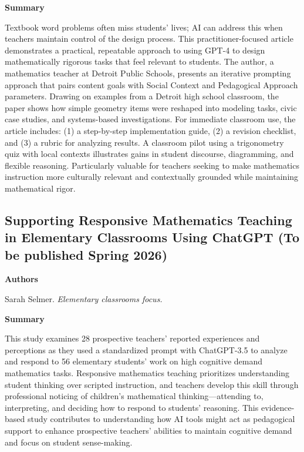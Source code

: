 \documentclass[11pt, a4paper]{article}
\newenvironment{annotation}[1]
{\par\vspace{2pt}\noindent\textbf{#1}\par\vspace{1pt}\noindent\small\ignorespaces}
{\par\vspace{3pt}}
\begin{document}
\begin{annotation}{Summary}
Textbook word problems often miss students' lives; AI can address this when teachers maintain control of the design process. This practitioner-focused article demonstrates a practical, repeatable approach to using GPT-4 to design mathematically rigorous tasks that feel relevant to students. The author, a mathematics teacher at Detroit Public Schools, presents an iterative prompting approach that pairs content goals with Social Context and Pedagogical Approach parameters. Drawing on examples from a Detroit high school classroom, the paper shows how simple geometry items were reshaped into modeling tasks, civic case studies, and systems-based investigations. For immediate classroom use, the article includes: (1) a step-by-step implementation guide, (2) a revision checklist, and (3) a rubric for analyzing results. A classroom pilot using a trigonometry quiz with local contexts illustrates gains in student discourse, diagramming, and flexible reasoning. Particularly valuable for teachers seeking to make mathematics instruction more culturally relevant and contextually grounded while maintaining mathematical rigor.
\end{annotation}


\subsection[\texorpdfstring{Supporting Responsive Mathematics Teaching in Elementary Classrooms Using ChatGPT }{Supporting Responsive Mathematics Teaching in Elementary Classrooms Using ChatGPT }]{Supporting Responsive Mathematics Teaching in Elementary Classrooms Using ChatGPT (To be published Spring 2026)}

\begin{annotation}{Authors}
Sarah Selmer. \textit{Elementary classrooms focus.}
\end{annotation}

\begin{annotation}{Summary}
This study examines 28 prospective teachers' reported experiences and perceptions as they used a standardized prompt with ChatGPT-3.5 to analyze and respond to 56 elementary students' work on high cognitive demand mathematics tasks. Responsive mathematics teaching prioritizes understanding student thinking over scripted instruction, and teachers develop this skill through professional noticing of children's mathematical thinking---attending to, interpreting, and deciding how to respond to students' reasoning. This evidence-based study contributes to understanding how AI tools might act as pedagogical support to enhance prospective teachers' abilities to maintain cognitive demand and focus on student sense-making.
\end{annotation}
\end{document}
